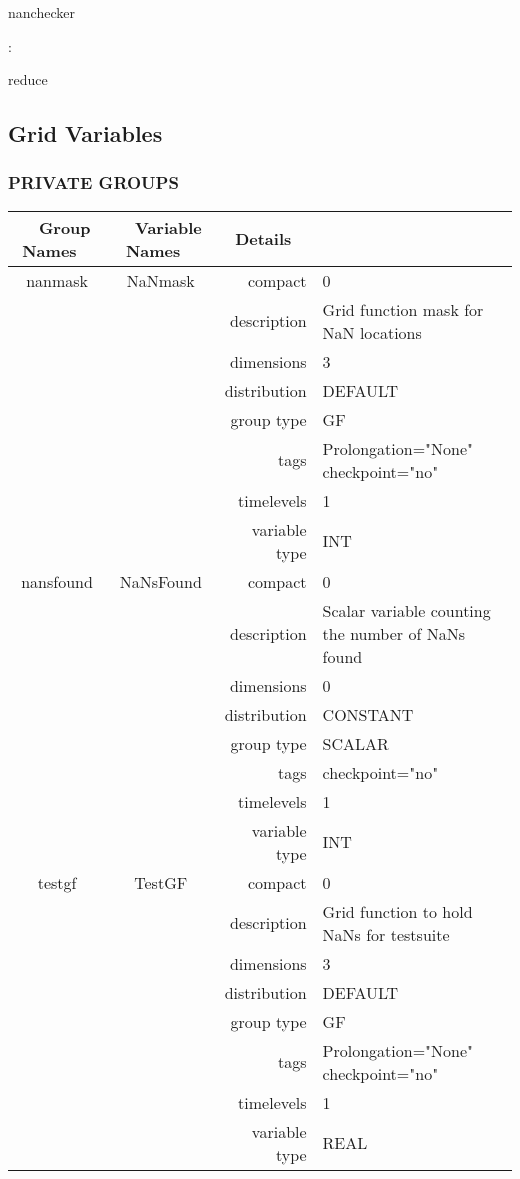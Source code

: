 \documentclass{article}
\begin{document}
nanchecker
\vspace{2mm}

: 

reduce
\vspace{2mm}
\subsection*{Grid Variables}
\vspace{5mm}\subsubsection{PRIVATE GROUPS}

\vspace{5mm}

\begin{tabular*}{150mm}{|c|c@{\extracolsep{\fill}}|rl|} \hline 
~ {\bf Group Names} ~ & ~ {\bf Variable Names} ~  &{\bf Details} ~ & ~\\ 
\hline 
nanmask & NaNmask & compact & 0 \\ 
 &  & description & Grid function mask for NaN locations \\ 
 &  & dimensions & 3 \\ 
 &  & distribution & DEFAULT \\ 
 &  & group type & GF \\ 
 &  & tags & Prolongation="None" checkpoint="no" \\ 
 &  & timelevels & 1 \\ 
 &  & variable type & INT \\ 
\hline 
nansfound & NaNsFound & compact & 0 \\ 
 &  & description & Scalar variable counting the number of NaNs found \\ 
 &  & dimensions & 0 \\ 
 &  & distribution & CONSTANT \\ 
 &  & group type & SCALAR \\ 
 &  & tags & checkpoint="no" \\ 
 &  & timelevels & 1 \\ 
 &  & variable type & INT \\ 
\hline 
testgf & TestGF & compact & 0 \\ 
 &  & description & Grid function to hold NaNs for testsuite \\ 
 &  & dimensions & 3 \\ 
 &  & distribution & DEFAULT \\ 
 &  & group type & GF \\ 
 &  & tags & Prolongation="None" checkpoint="no" \\ 
 &  & timelevels & 1 \\ 
 &  & variable type & REAL \\ 
\hline 
\end{tabular*} 
\end{document}
